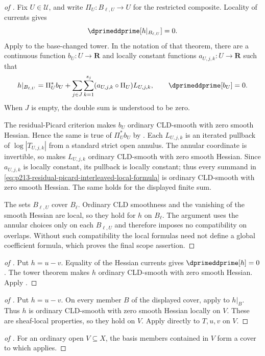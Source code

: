 \begin{proof}[of
]
Fix $U\in\mathcal U$, and write $\Pi_U:B_{\ell,U}\to U$ for the
restricted composite.  Locality of currents gives
\[
                 \dprimeddprime[h|_{B_{\ell,U}}]=0.
\]
Apply
 to the
base-changed tower.  In the notation of that theorem, there are a continuous
function $b_U:U\to\mathbf R$ and locally constant functions
$a_{U,j,k}:U\to\mathbf R$ such that
\begin{equation}
\label{eq:p213-residual-picard-interleaved-local-formula}
 h|_{B_{\ell,U}}
 =\Pi_U^*b_U+
   \sum_{j\in J}\sum_{k=1}^{s_j}
      (a_{U,j,k}\circ\Pi_U)L_{U,j,k},
 \qquad \dprimeddprime[b_U]=0.
\end{equation}
When $J$ is empty, the double sum is understood to be zero.

The residual-Picard criterion
 makes $b_U$ ordinary
CLD-smooth with zero smooth Hessian.  Hence the same is true of
$\Pi_U^*b_U$ by .  Each $L_{U,j,k}$ is an
iterated pullback of $\log|T_{U,j,k}|$ from a standard strict open annulus.
The annular coordinate is invertible, so
 makes $L_{U,j,k}$
ordinary CLD-smooth with zero smooth Hessian.  Since $a_{U,j,k}$ is locally
constant, its pullback is locally constant; thus every summand in
\eqref{eq:p213-residual-picard-interleaved-local-formula} is ordinary
CLD-smooth with zero smooth Hessian.  The same holds for the displayed
finite sum.

The sets $B_{\ell,U}$ cover $B_\ell$.  Ordinary CLD smoothness and the
vanishing of the smooth Hessian are local, so they hold for $h$ on
$B_\ell$.  The argument uses the annular choices only on each
$B_{\ell,U}$ and therefore imposes no compatibility on overlaps.  Without
such compatibility the local formulas need not define a global coefficient
formula, which proves the final scope assertion.
\end{proof}

\begin{proof}[of
]
Put $h=u-v$.  Equality of the Hessian currents gives
$\dprimeddprime[h]=0$.  The tower theorem makes $h$ ordinary CLD-smooth
with zero smooth Hessian.  Apply .
\end{proof}

\begin{proof}[of
]
Put $h=u-v$.  On every member $B$ of the displayed cover, apply
 to $h|_B$.
Thus $h$ is ordinary CLD-smooth with zero smooth Hessian locally on $V$.
These are sheaf-local properties, so they hold on $V$.  Apply
 directly to $T,u,v$ on $V$.
\end{proof}

\begin{proof}[of
]
For an ordinary open $V\subseteq X$, the basis members contained in $V$
form a cover to which
applies.
\end{proof}
